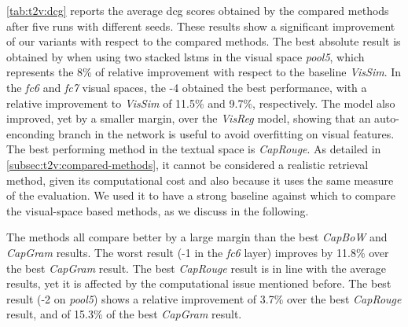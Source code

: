 \ref{tab:t2v:dcg} reports the average \gls{dcg} scores obtained by the compared methods after five runs with different seeds. %
These results show a significant improvement of our \ttv{} variants with respect to the compared methods.
The best absolute result is obtained by \widedeepttv{} when using two stacked \glspl{lstm} in the visual space \emph{pool5}, which represents the 8\% of relative improvement with respect to the baseline \emph{VisSim}.
In the \emph{fc6} and \emph{fc7} visual spaces, the \widedeepttv{}-4 obtained the best performance, with a relative improvement to \emph{VisSim} of 11.5\% and 9.7\%, respectively.
The \sparsettv{} model also improved, yet by a smaller margin, over the \emph{VisReg} model, showing that an auto-enconding branch in the network is useful to avoid overfitting on visual features.
The best performing method in the textual space is \emph{CapRouge}.
As detailed in \ref{subsec:t2v:compared-methods}, it cannot be considered a realistic retrieval method, given its computational cost and also because it uses the same measure of the evaluation.
We used it to have a strong baseline against which to compare the visual-space based methods, as we discuss in the following.

The \ttv{} methods all compare better by a large margin than the best \emph{CapBoW} and \emph{CapGram} results.
The worst \ttv{} result (\densettv{}-1 in the \emph{fc6} layer) improves by 11.8\% over the best \emph{CapGram} result.
The best \emph{CapRouge} result is in line with the average \ttv{} results, yet it is affected by the computational issue mentioned before.
The best \ttv{} result (\widedeepttv{}-2 on \emph{pool5}) shows a relative improvement of 3.7\% over the best \emph{CapRouge} result, and of 15.3\% of the best \emph{CapGram} result.

